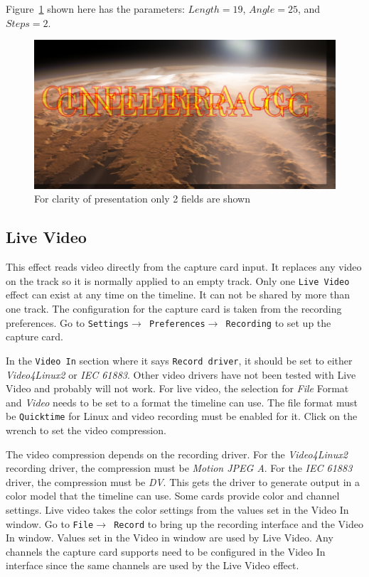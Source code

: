 Figure~\ref{fig:linear} shown here has the parameters: $Length=19$, $Angle=25$, and $Steps=2$.

\begin{figure}[htpb]
    \centering
    \includegraphics[width=0.8\linewidth]{images/linear.png}
    \caption{For clarity of presentation only 2 fields are shown}
    \label{fig:linear}
\end{figure}

\subsection{Live Video}%
\label{sub:live_video}

This effect reads video directly from the capture card input. It replaces any video on the track so it is normally applied to an empty track. Only one \texttt{Live Video} effect can exist at any time on the timeline. It can not be shared by more than one track. The configuration for the capture card is taken from the recording preferences. Go to \texttt{Settings$\rightarrow$ Preferences$\rightarrow$ Recording} to set up the capture card.

In the \texttt{Video In} section where it says \texttt{Record driver}, it should be set to either \textit{Video4Linux2} or \textit{IEC 61883}. Other video drivers have not been tested with Live Video and probably will not work. For live video, the selection for \textit{File} Format and \textit{Video} needs to be set to a format the timeline can use. The file format must be \texttt{Quicktime} for Linux and video recording must be enabled for it. Click on the wrench to set the video compression.

The video compression depends on the recording driver. For the \textit{Video4Linux2} recording driver, the compression must be \textit{Motion JPEG A}. For the \textit{IEC 61883} driver, the compression must be \textit{DV}. This gets the driver to generate output in a color model that the timeline can use. Some cards provide color and channel settings. Live video takes the color settings from the values set in the Video In window. Go to \texttt{File$\rightarrow$ Record} to bring up the recording interface and the Video In window. Values set in the Video in window are used by Live Video. Any channels the capture card supports need to be configured in the Video In interface since the same channels are used by the Live Video effect.

